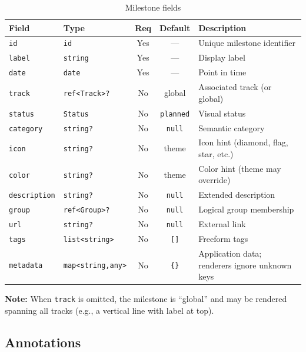 \begin{table}[h]
\centering
\small
\begin{tabular}{llccp{4.5cm}}
\toprule
\textbf{Field} & \textbf{Type} & \textbf{Req} & \textbf{Default} & \textbf{Description} \\
\midrule
\texttt{id} & \texttt{id} & Yes & --- & Unique milestone identifier \\
\texttt{label} & \texttt{string} & Yes & --- & Display label \\
\texttt{date} & \texttt{date} & Yes & --- & Point in time \\
\texttt{track} & \texttt{ref<Track>?} & No & global & Associated track (or global) \\
\texttt{status} & \texttt{Status} & No & \texttt{planned} & Visual status \\
\texttt{category} & \texttt{string?} & No & \texttt{null} & Semantic category \\
\texttt{icon} & \texttt{string?} & No & theme & Icon hint (diamond, flag, star, etc.) \\
\texttt{color} & \texttt{string?} & No & theme & Color hint (theme may override) \\
\texttt{description} & \texttt{string?} & No & \texttt{null} & Extended description \\
\texttt{group} & \texttt{ref<Group>?} & No & \texttt{null} & Logical group membership \\
\texttt{url} & \texttt{string?} & No & \texttt{null} & External link \\
\texttt{tags} & \texttt{list<string>} & No & \texttt{[]} & Freeform tags \\
\texttt{metadata} & \texttt{map<string,any>} & No & \texttt{\{\}} & Application data; renderers ignore unknown keys \\
\bottomrule
\end{tabular}
\caption{Milestone fields}
\label{tab:milestone-fields}
\end{table}

\textbf{Note:} When \texttt{track} is omitted, the milestone is ``global'' and may be
rendered spanning all tracks (e.g., a vertical line with label at top).

\subsection{Annotations}
\label{sec:ir-annotations}

